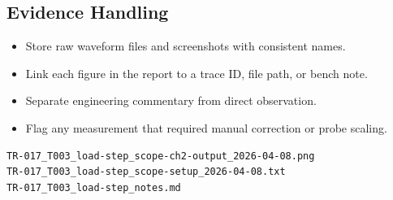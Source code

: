 \subsection{Evidence Handling}
\begin{itemize}
    \item Store raw waveform files and screenshots with consistent names.
    \item Link each figure in the report to a trace ID, file path, or bench note.
    \item Separate engineering commentary from direct observation.
    \item Flag any measurement that required manual correction or probe scaling.
\end{itemize}

\begin{lstlisting}[caption={Example capture naming convention},label={lst:capture-name}]
TR-017_T003_load-step_scope-ch2-output_2026-04-08.png
TR-017_T003_load-step_scope-setup_2026-04-08.txt
TR-017_T003_load-step_notes.md
\end{lstlisting}
